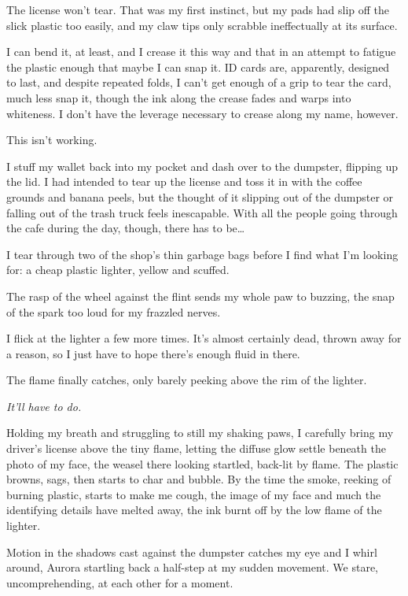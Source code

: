 The license won't tear. That was my first instinct, but my pads had slip off the slick plastic too easily, and my claw tips only scrabble ineffectually at its surface.

I can bend it, at least, and I crease it this way and that in an attempt to fatigue the plastic enough that maybe I can snap it. ID cards are, apparently, designed to last, and despite repeated folds, I can't get enough of a grip to tear the card, much less snap it, though the ink along the crease fades and warps into whiteness. I don't have the leverage necessary to crease along my name, however.

This isn't working.

I stuff my wallet back into my pocket and dash over to the dumpster, flipping up the lid. I had intended to tear up the license and toss it in with the coffee grounds and banana peels, but the thought of it slipping out of the dumpster or falling out of the trash truck feels inescapable. With all the people going through the cafe during the day, though, there has to be\ldots{}

I tear through two of the shop's thin garbage bags before I find what I'm looking for: a cheap plastic lighter, yellow and scuffed.

The rasp of the wheel against the flint sends my whole paw to buzzing, the snap of the spark too loud for my frazzled nerves.

I flick at the lighter a few more times. It's almost certainly dead, thrown away for a reason, so I just have to hope there's enough fluid in there.

The flame finally catches, only barely peeking above the rim of the lighter.

\emph{It'll have to do.}

Holding my breath and struggling to still my shaking paws, I carefully bring my driver's license above the tiny flame, letting the diffuse glow settle beneath the photo of my face, the weasel there looking startled, back-lit by flame. The plastic browns, sags, then starts to char and bubble. By the time the smoke, reeking of burning plastic, starts to make me cough, the image of my face and much the identifying details have melted away, the ink burnt off by the low flame of the lighter.

Motion in the shadows cast against the dumpster catches my eye and I whirl around, Aurora startling back a half-step at my sudden movement. We stare, uncomprehending, at each other for a moment.

